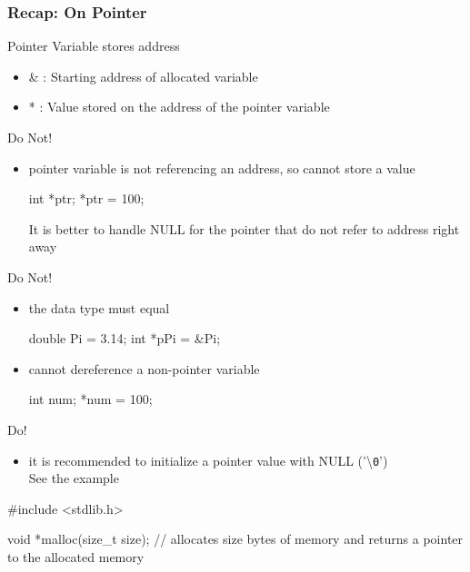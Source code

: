 \documentclass[newPxFont,sthlmFooter,nooffset]{beamer}
\begin{document}
\begin{frame}
  \frametitle{Recap: On Pointer}
Pointer Variable stores address
\begin{itemize}
\item \& : Starting address of allocated variable
\item * : Value stored on the address of the pointer variable
\end{itemize}



\framebreak
  Do Not!
  \begin{itemize}
  \item pointer variable is not referencing an address, so cannot store a value
\begin{codedef}
int *ptr;
*ptr = 100;
\end{codedef}
It is better to handle NULL for the pointer that do not refer to address right away
\end{itemize}

\framebreak


Do Not!
\begin{itemize}
\item the data type must equal
\begin{codedef}
double Pi = 3.14;
int *pPi = &Pi; 
\end{codedef}
\item cannot dereference a non-pointer variable
\begin{codedef}
int num;
*num = 100;  
\end{codedef}
\end{itemize}

\framebreak


Do!
  \begin{itemize}
\item it is recommended to initialize a pointer value with NULL ('\textbackslash \texttt{0}') \\ 
See the example
  \end{itemize}


\framebreak


\begin{codedef}
#include <stdlib.h>

void *malloc(size_t size); // allocates size bytes of memory and returns a pointer to the allocated memory


\end{codedef}
\end{frame}
\end{document}
